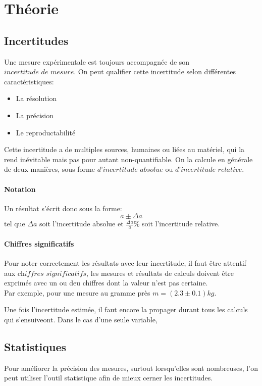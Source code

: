 \section{Théorie}
\subsection{Incertitudes}

Une mesure expérimentale est toujours accompagnée de son $\textit{incertitude de mesure}$. On peut qualifier cette incertitude selon différentes caractéristiques:
\begin{itemize}
\item La résolution
\item La précision
\item Le reproductabilité
\end{itemize}

Cette incertitude a de multiples sources, humaines ou liées au matériel, qui la rend inévitable mais pas pour autant non-quantifiable.
On la calcule en générale de deux manières, sous forme $\textit{d'incertitude absolue}$ ou $\textit{d'incertitude relative}$.

\paragraph{Notation}
Un résultat s'écrit donc sous la forme: \[a\pm\Delta a\] tel que $\Delta a$ soit l'incertitude absolue et $\frac{\Delta a}{a} \%$ soit l'incertitude relative.

\paragraph{Chiffres significatifs}
Pour noter correctement les résultats avec leur incertitude, il faut être attentif aux $\textit{chiffres significatifs}$, les mesures et résultats de calculs doivent être exprimés avec un ou deu chiffres dont la valeur n'est pas certaine.\\
Par exemple, pour une mesure au gramme près $m = (2.3\pm0.1)kg$.

Une fois l'incertitude estimée, il faut encore la propager durant tous les calculs qui s'ensuiveont. Dans le cas d'une seule variable, 

\subsection{Statistiques}
Pour améliorer la précision des mesures, surtout lorsqu'elles sont nombreuses, l'on peut utiliser l'outil statistique afin de mieux cerner les incertitudes.

